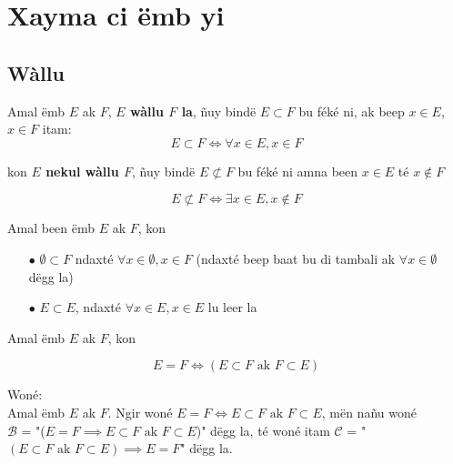\documentclass[twoside, a4paper]{article}
\begin{document}
\section{Xayma ci ëmb yi}

\subsection{Wàllu}
\begin{tcolorbox}[enhanced jigsaw,breakable,pad at break*=1mm, colback=red!5!white,colframe=white!75!black,title= Téeki,watermark color=white]
Amal ëmb $E$ ak $F$, \textbf{$E$ wàllu $F$ la}, ñuy bindë $E\subset F$ bu féké ni, ak beep $x\in E$, $x\in F$ itam:
$$E \subset F \iff \forall x \in E, x \in F$$

kon \textbf{$E$ nekul wàllu $F$}, ñuy bindë $E \not \subset F$ bu féké ni amna been $x \in E$ té $x \not \in F$

$$E \not \subset F \iff \exists x \in E, x \not \in F$$
\end{tcolorbox}
\begin{tcolorbox}[enhanced jigsaw,breakable,pad at break*=1mm, colback=orange!5!white,colframe=white!75!black,title= Seetlu,
  watermark color=white]
Amal been ëmb $E$ ak $F$, kon 
\begin{itemize}
    \item[$\bullet$] $\emptyset \subset F$ ndaxté $\forall x \in \emptyset, x\in F$ (ndaxté beep baat bu di tambali ak $\forall x \in \emptyset$ dëgg la)
    \item[$\bullet$] $E \subset E$, ndaxté $\forall x \in E, x \in E$ lu leer la
\end{itemize}
\end{tcolorbox}

\begin{tcolorbox}[enhanced jigsaw,breakable,pad at break*=1mm, colback=blue!5!white,colframe=white!75!black,title= Tèg\footnote{Proposition},
  watermark color=white]
Amal ëmb $E$ ak $F$, kon 

$$E = F \iff (E \subset F \text{ ak } F \subset E) $$
\end{tcolorbox}
Woné:\\

Amal ëmb $E$ ak $F$. Ngir woné $E = F \iff E \subset F \text{ ak } F \subset E $, mën nañu woné  \\
$\mathcal{B}$ = "($E = F \implies E \subset F \text{ ak } F \subset E $)" dëgg la, té woné itam $\mathcal{C}$ = "$(E \subset F \text{ ak } F \subset E) \implies E=F $" dëgg la.\\
\end{document}
